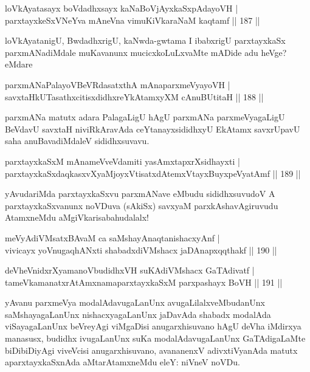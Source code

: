 \begin{shl}
loVkAyatasayx boVdadhxsayx kaNaBoVjAyxkaSxpAdayoVH | \\
parxtayxkeSxVNeYva mAneVna vimuKiVkaraNaM kaqtamf \hfill||  187 ||  
\end{shl}

\begin{artha}
loVkAyatanigU, BwdadhxrigU, kaNwda-gwtama I ibabxrigU parxtayxkaSx parxmANadiMdale muKavanunx mucicxkoLuLxvaMte mADide adu heVge? eMdare
\end{artha}

\begin{shl}
parxmANaPalayoVBeVRdasatxthA mAnaparxmeVyayoVH | \\
savxtaHkUTasathxcitisxdidhxreYkAtamxyXM cAnuBUtitaH \hfill||  188 ||  
\end{shl}

\begin{artha}
parxmANa matutx adara PalagaLigU hAgU parxmANa parxmeVyagaLigU BeVdavU savxtaH niviRkAravAda ceYtanayxsididhxyU EkAtamx savxrUpavU saha anuBavadiMdaleV sididhxsuvavu.
\end{artha}

\begin{shl}
parxtayxkaSxM mAnameVveVdamiti yasAmxtapxrXsidhayxti | \\
parxtayxkaSxdaqkasxvXyaMjoyxVtisatxdAtemxVtayxBuyxpeVyatAmf \hfill||  189 ||  
\end{shl}

\begin{artha}
yAvudariMda parxtayxkaSxvu parxmANave eMbudu sididhxsuvudoV A parxtayxkaSxvanunx noVDuva (sAkiSx) savxyaM parxkAshavAgiruvudu AtamxneMdu aMgiVkarisabahudalalx! 
\end{artha}

\begin{shl}
meVyAdiVMsatxBAvaM ca saMshayAnaqtanishacxyAnf | \\
vivicayx yoV\s nugaqhANxti shabadxdiVMshacx jaDAnapxqqthakf \hfill||  190 ||  
\end{shl}

\begin{shl}
deVheVnidxrXyamanoVbudidhxVH suKAdiVMshacx GaTAdivatf | \\
tameVkamanatxrAtAmxnamaparxtayxkaSxM parxpashayx BoVH \hfill||  191 ||  
\end{shl}

\begin{artha}
yAvanu parxmeVya modalAdavugaLanUnx avugaLilalxveMbudanUnx saMshayagaLanUnx nishacxyagaLanUnx jaDavAda shabadx modalAda viSayagaLanUnx beVreyAgi viMgaDisi anugarxhisuvano hAgU deVha iMdirxya manasusx, budidhx ivugaLanUnx suKa modalAdavugaLanUnx GaTAdigaLaMte biDibiDiyAgi viveVcisi anugarxhisuvano, avananenxV adivxtiVyanAda matutx aparxtayxkaSxnAda aMtarAtamxneMdu eleY: niVneV noVDu.
\end{artha}

